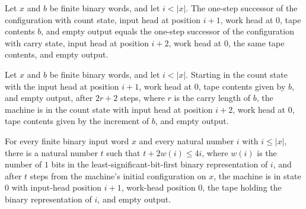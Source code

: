 \begin{lemma}
\label{Complexity.counter_start}
\leanok
{}
Let $x$ and $b$ be finite binary words, and let $i<|x|$. The one-step successor of the
configuration with count state, input head at position $i+1$, work head at $0$, tape
contents $b$, and empty output equals the one-step successor of the configuration with
carry state, input head at position $i+2$, work head at $0$, the same tape contents, and
empty output.
\end{lemma}

\begin{lemma}
\label{Complexity.counter_increment}
\leanok
{}
Let $x$ and $b$ be finite binary words, and let $i<|x|$. Starting in the count state
with the input head at position $i+1$, work head at $0$, tape contents given by $b$, and
empty output, after $2r+2$ steps, where $r$ is the carry length of $b$, the machine is
in the count state with input head at position $i+2$, work head at $0$, tape contents
given by the increment of $b$, and empty output.
\end{lemma}

\begin{lemma}
\label{Complexity.counter_count}
\leanok
{}
For every finite binary input word $x$ and every natural number $i$ with $i\le |x|$,
there is a natural number $t$ such that $t+2w(i)\le4i$, where $w(i)$ is the number of
$1$ bits in the least-significant-bit-first binary representation of $i$, and after $t$
steps from the machine's initial configuration on $x$, the machine is in state $0$ with
input-head position $i+1$, work-head position $0$, the tape holding the binary
representation of $i$, and empty output.
\end{lemma}

